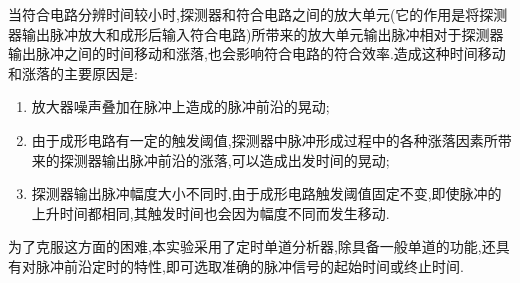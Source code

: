 \documentclass[a4paper]{article}
\begin{document}
当符合电路分辨时间较小时,探测器和符合电路之间的放大单元(它的作用是将探测器输出脉冲放大和成形后输入符合电路)所带来的放大单元输出脉冲相对于探测器输出脉冲之间的时间移动和涨落,也会影响符合电路的符合效率.造成这种时间移动和涨落的主要原因是:
\begin{enumerate}[1.]
\item 放大器噪声叠加在脉冲上造成的脉冲前沿的晃动;
\item 由于成形电路有一定的触发阈值,探测器中脉冲形成过程中的各种涨落因素所带来的探测器输出脉冲前沿的涨落,可以造成出发时间的晃动;
\item 探测器输出脉冲幅度大小不同时,由于成形电路触发阈值固定不变,即使脉冲的上升时间都相同,其触发时间也会因为幅度不同而发生移动.
\end{enumerate}
为了克服这方面的困难,本实验采用了定时单道分析器,除具备一般单道的功能,还具有对脉冲前沿定时的特性,即可选取准确的脉冲信号的起始时间或终止时间.
\newpage
\end{document}
